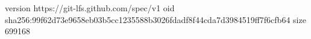 version https://git-lfs.github.com/spec/v1
oid sha256:99f62d73e9658eb03b5cc1235588b3026fdadf8f44cda7d3984519ff7f6cfb64
size 699168
